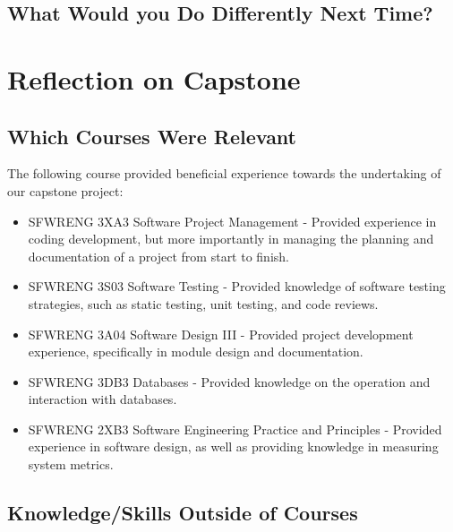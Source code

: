 \documentclass{article}
\begin{document}

\subsection{What Would you Do Differently Next Time?}


\section{Reflection on Capstone}


\subsection{Which Courses Were Relevant}

The following course provided beneficial experience towards the undertaking of our capstone project:
\begin{itemize}
	\item SFWRENG 3XA3 Software Project Management - Provided experience in coding development, but more importantly in managing the planning and documentation of a project from start to finish.
	\item SFWRENG 3S03 Software Testing - Provided knowledge of software testing strategies, such as static testing, unit testing, and code reviews.
	\item SFWRENG 3A04 Software Design III - Provided project development experience, specifically in module design and documentation.
	\item SFWRENG 3DB3 Databases - Provided knowledge on the operation and interaction with databases.
	\item SFWRENG 2XB3 Software Engineering Practice and Principles - Provided experience in software design, as well as providing knowledge in measuring system metrics.
\end{itemize}

\subsection{Knowledge/Skills Outside of Courses}

\end{document}
